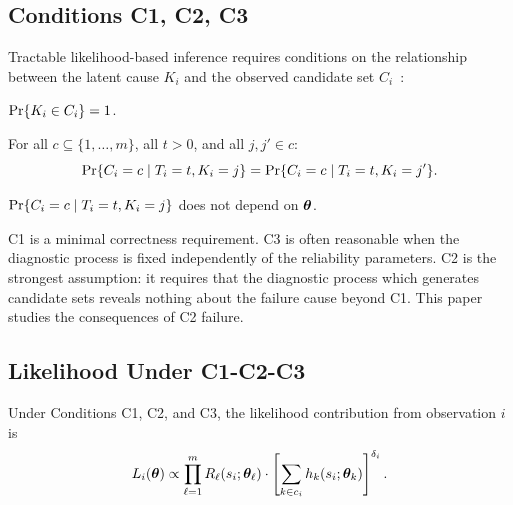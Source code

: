 \subsection{Conditions C1, C2, C3}
\label{sec:conditions}

Tractable likelihood-based inference requires conditions on the relationship
between the latent cause $K_i$ and the observed candidate set
$C_i$~\citep{Usher-1988, Lin-1993, Huairu-2013}:

\begin{condition}
\label{cond:C1}
$\mathrm{Pr}\{K_i \in C_i\} = 1$.
\end{condition}

\begin{condition}
\label{cond:C2}
For all $c \subseteq \{1,\ldots,m\}$, all $t > 0$, and all $j, j' \in c$:
\begin{equation}
    \mathrm{Pr}\{C_i = c \mid T_i = t, K_i = j\} =
    \mathrm{Pr}\{C_i = c \mid T_i = t, K_i = j'\}.
\end{equation}
\end{condition}

\begin{condition}
\label{cond:C3}
$\mathrm{Pr}\{C_i = c \mid T_i = t, K_i = j\}$ does not depend on $\bm{\theta}$.
\end{condition}

C1 is a minimal correctness requirement. C3 is often reasonable when the
diagnostic process is fixed independently of the reliability parameters. C2 is
the strongest assumption: it requires that the diagnostic process which
generates candidate sets reveals nothing about the failure cause beyond C1.
This paper studies the consequences of C2 failure.

\subsection{Likelihood Under C1-C2-C3}
\label{sec:like-C123}

\begin{theorem}
\label{thm:like-C123}
Under Conditions C1, C2, and C3, the likelihood contribution from observation
$i$ is
\begin{equation}
\label{eq:like-C123}
    L_i(\bm{\theta}) \propto \prod_{\ell=1}^m R_\ell(s_i; \bm{\theta}_\ell) \cdot
    \left[\sum_{k \in c_i} h_k(s_i; \bm{\theta}_k)\right]^{\delta_i}.
\end{equation}
\end{theorem}


